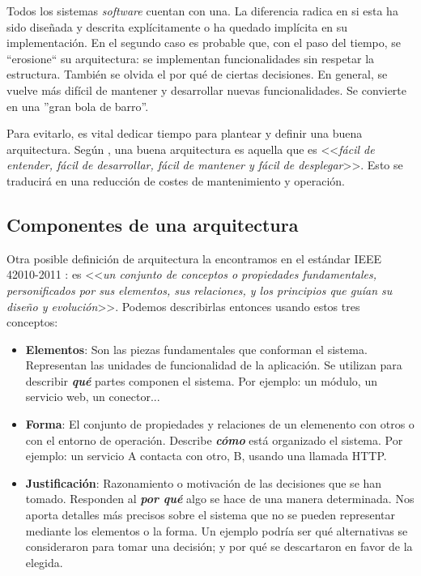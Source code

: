 Todos los sistemas \emph{software} cuentan con una. La diferencia radica en si esta ha sido diseñada y descrita explícitamente o ha quedado implícita en su implementación. \cite{taylorSoftwareArchitectureFoundations2009} En el segundo caso es probable que, con el paso del tiempo, se ``erosione`` su arquitectura: se implementan funcionalidades sin respetar la estructura. También se olvida el por qué de ciertas decisiones. En general, se vuelve más difícil de mantener y desarrollar nuevas funcionalidades. Se convierte en una ''gran bola de barro''. \cite{footeBigBallMud1997}

Para evitarlo, es vital dedicar tiempo para plantear y definir una buena arquitectura. Según \cite{martinChapter15What2018}, una buena arquitectura es aquella que es <<\emph{fácil de entender, fácil de desarrollar, fácil de mantener y fácil de desplegar}>>. Esto se traducirá en una reducción de costes de mantenimiento y operación.

\subsection{Componentes de una arquitectura}

Otra posible definición de arquitectura la encontramos en el estándar IEEE 42010-2011 \cite{ieeeStandard420102011Systems2011}: es <<\emph{un conjunto de conceptos o propiedades fundamentales, personificados por sus elementos, sus relaciones, y los principios que guían su diseño y evolución}>>. Podemos describirlas entonces usando estos tres conceptos: \cite{perryFoundationsStudySoftware1992}

    \begin{itemize}
        \item \textbf{Elementos}: Son las piezas fundamentales que conforman el sistema. Representan las unidades de funcionalidad de la aplicación. Se utilizan para describir \textbf{\emph{qué}} partes componen el sistema. Por ejemplo: un módulo, un servicio web, un conector...

        \item \textbf{Forma}: El conjunto de propiedades y relaciones de un elemenento con otros o con el entorno de operación. Describe \textbf{\emph{cómo}} está organizado el sistema. Por ejemplo: un servicio A contacta con otro, B, usando una llamada HTTP.

        \item \textbf{Justificación}: Razonamiento o motivación de las decisiones que se han tomado. Responden al \textbf{\emph{por qué}} algo se hace de una manera determinada. Nos aporta detalles más precisos sobre el sistema que no se pueden representar mediante los elementos o la forma. Un ejemplo podría ser qué alternativas se consideraron para tomar una decisión; y por qué se descartaron en favor de la elegida.

    \end{itemize}

